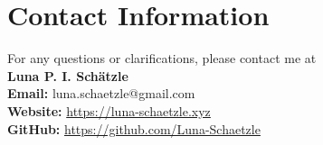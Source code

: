 \documentclass[12pt,a4paper]{article}
\begin{document}
\section*{Contact Information}
For any questions or clarifications, please contact me at \\ 
\textbf{Luna P. I. Schätzle \\}
\textbf{Email:} luna.schaetzle@gmail.com \\
\textbf{Website:} \url{https://luna-schaetzle.xyz} \\
\textbf{GitHub:} \url{https://github.com/Luna-Schaetzle}
\end{document}
